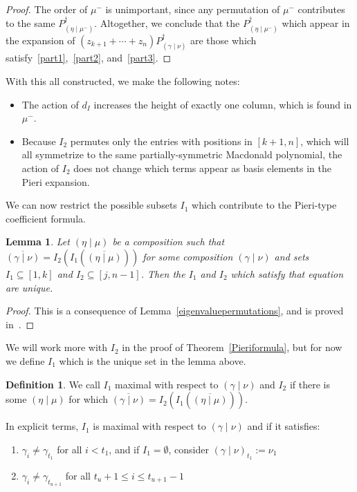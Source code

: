 \documentclass[11pt]{article}
\newtheorem{lemm}[theo]{Lemma}
\theoremstyle{definition}
\newtheorem{defi}[theo]{Definition}
\numberwithin{equation}{section}
\newcommand{\PB}[1]{P_{#1}^\dagger}
\newcommand{\gammanu}{{(\gamma \mid \nu)}}
\newcommand{\etamu}{{(\eta \mid \mu^-)}}
\newcommand{\dI}{d_I}
\begin{document}
\begin{proof}
The order of $\mu^-$ is unimportant, since any permutation of $\mu^-$ contributes to the same $\PB{\etamu}$. Altogether, we conclude that the $\PB{\etamu}$ which appear in the expansion of $(z_{k+1} + \dotsm + z_{n})\PB{\gammanu}$ are those which satisfy~\eqref{part1},~\eqref{part2}, and~\eqref{part3}. \qedhere \end{proof}



 With this all constructed, we make the following notes:
\begin{itemize}
    \item The action of $\dI$ increases the height of exactly one column, which is found in $\mu^-$.
    \item Because $I_2$ permutes only the entries with positions in $[k+1,n]$, which will all symmetrize to the same partially-symmetric Macdonald polynomial, the action of $I_2$ does not change which terms appear as basis elements in the Pieri expansion.
\end{itemize}

We can now restrict the possible subsets $I_1$ which contribute to the Pieri-type coefficient formula.

\begin{lemm}\label{comaximality}Let $(\eta \mid \mu)$ be a composition such that $\overline{\gammanu} = I_2\left( I_1 \left(\overline{(\eta \mid \mu)} \right)\right)$ for some composition $\gammanu$ and sets $I_1\subseteq [1,k]$ and $I_2 \subseteq [j,n-1]$. Then the $I_1$ and $I_2$ which satisfy that equation are unique.
\end{lemm}
\begin{proof}
This is a consequence of Lemma~\ref{eigenvaluepermutations}, and is proved in~\cite[proof of Lemma~4.3] {MR1456318}.
\end{proof}

We will work more with $I_2$ in the proof of Theorem~\ref{Pieriformula}, but for now we define $I_1$ which is the unique set in the lemma above.


\begin{defi}\label{maximality}
We call $I_1$ maximal with respect to $(\gamma \mid \nu)$ and $I_2$ if there is some $(\eta \mid \mu)$ for which $\overline{(\gamma \mid \nu)} = I_2 \left( I_1 \left( \overline{(\eta \mid \mu)} \right)\right)$.
\end{defi}
In explicit terms, $I_1$ is maximal with respect to $\gammanu$ and if it satisfies:
\begin{enumerate}
    \item $\gamma_i \neq \gamma_{t_1}$ for all $i< t_1$, and if $I_1=\emptyset$, consider $\gammanu_{t_1} := \nu_1$ \item $\gamma_i \neq \gamma_{t_{u+1}}$ for all $t_u+1 \leq i \leq t_{u+1}-1$
\end{enumerate}
\end{document}
